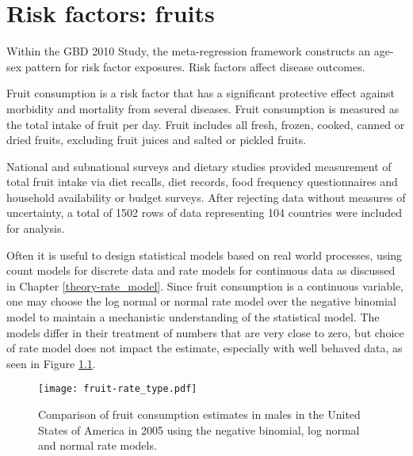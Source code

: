 \chapter{Risk factors: fruits}
\label{applications-log_normal}

Within the GBD 2010 Study, the meta-regression framework constructs an
age-sex pattern for risk factor exposures.  Risk factors affect
disease outcomes.

Fruit consumption is a risk factor that has a significant protective
effect against morbidity and mortality from several diseases.  Fruit
consumption is measured as the total intake of fruit per day.  Fruit
includes all fresh, frozen, cooked, canned or dried fruits, excluding
fruit juices and salted or pickled fruits. \cite{he_increased_2007,
  boeing_intake_2006}

National and subnational surveys and dietary studies provided
measurement of total fruit intake via diet recalls, diet records, food
frequency questionnaires and household availability or budget surveys.
After rejecting data without measures of uncertainty, a total of 1502
rows of data representing 104 countries were included for analysis.

Often it is useful to design statistical models based on real world
processes, using count models for discrete data and rate models for
continuous data as discussed in Chapter \ref{theory-rate_model}.
Since fruit consumption is a continuous variable, one may choose the
log normal or normal rate model over the negative binomial model to
maintain a mechanistic understanding of the statistical model.  The
models differ in their treatment of numbers that are very close to
zero, but choice of rate model does not impact the estimate,
especially with well behaved data, as seen in Figure
\ref{fig:app-fruit rate type}.

    \begin{figure}[h]
        \begin{center}
            \texttt{[image: fruit-rate\_type.pdf]}
            \caption{Comparison of fruit consumption estimates in
              males in the United States of America in 2005 using the
              negative binomial, log normal and normal rate models.}
            \label{fig:app-fruit rate type}
        \end{center}
    \end{figure} 
